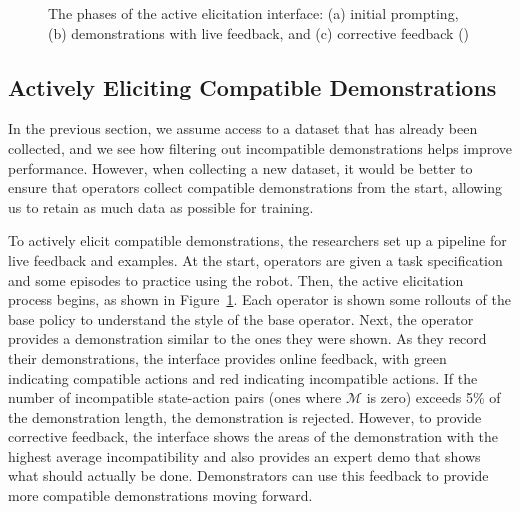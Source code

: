\documentclass[
  letterpaper,
  numbers=noenddot,
  DIV=11,
  oneside]{scrreprt}
\theoremstyle{remark}
\begin{document}
\begin{figure}


\caption{\label{fig-active_elicitation}The phases of the active
elicitation interface: (a) initial prompting, (b) demonstrations with
live feedback, and (c) corrective feedback
()}

\end{figure}%

\subsection{Actively Eliciting Compatible
Demonstrations}\label{actively-eliciting-compatible-demonstrations}

In the previous section, we assume access to a dataset that has already
been collected, and we see how filtering out incompatible demonstrations
helps improve performance. However, when collecting a new dataset, it
would be better to ensure that operators collect compatible
demonstrations from the start, allowing us to retain as much data as
possible for training.

To actively elicit compatible demonstrations, the researchers set up a
pipeline for live feedback and examples. At the start, operators are
given a task specification and some episodes to practice using the
robot. Then, the active elicitation process begins, as shown in
Figure~\ref{fig-active_elicitation}. Each operator is shown some
rollouts of the base policy to understand the style of the base
operator. Next, the operator provides a demonstration similar to the
ones they were shown. As they record their demonstrations, the interface
provides online feedback, with green indicating compatible actions and
red indicating incompatible actions. If the number of incompatible
state-action pairs (ones where \(\mathcal{M}\) is zero) exceeds 5\% of
the demonstration length, the demonstration is rejected. However, to
provide corrective feedback, the interface shows the areas of the
demonstration with the highest average incompatibility and also provides
an expert demo that shows what should actually be done. Demonstrators
can use this feedback to provide more compatible demonstrations moving
forward.
\end{document}
